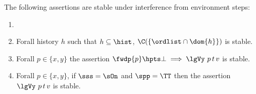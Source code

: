 \begin{lemma}\label{lem:menvs-scan}
The following assertions are stable under interference from
environment steps:

\begin{enumerate}
 \item \label{lem:menvs:green-phist}

 \item\label{lem:menvs:green-subhist} Forall history $h$ such that $ h
   \subseteq \hist$, $\C(\{ \ordlist \cap \dom{h}\})$ is stable.

 \item \label{lem:menvs:none-lgVy} Forall $p \in \{x, y\}$ the
   assertion $\fwdp{p} \hpts \bot \implies \lgVy\ p\, t\, v$ is stable.

 \item \label{lem:menvs:some-lgVy} Forall $p \in \{x, y\}$, if $\sss =
   \sOn$ and $\spp = \TT$ then the assertion $ \lgVy\ p\, t\, v$ is
   stable.
\end{enumerate}
\end{lemma}



